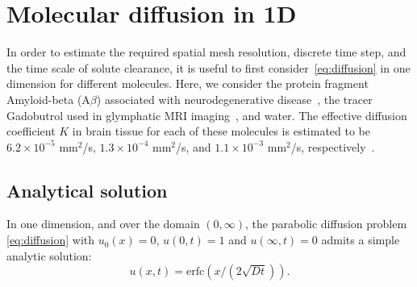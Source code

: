 

\section{Molecular diffusion in 1D}
\label{sec:chp6:1D-tests}

In order to estimate the required spatial mesh resolution, discrete
time step, and the time scale of solute clearance, it is useful to
first consider~\eqref{eq:diffusion} in one dimension for different
molecules. Here, we consider the protein fragment Amyloid-beta
(A$\beta$) associated with neurodegenerative
disease~\cite{iliff2012paravascular}, the tracer Gadobutrol used in
glymphatic MRI imaging~\cite{ringstad2018brain}, and water. The
effective diffusion coefficient $K$ in brain tissue for each of these
molecules is estimated to be $6.2 \times 10^{-5}$ mm$^2$/s,
$1.3 \times 10^{-4}$ mm$^2$/s, and $1.1 \times 10^{-3}$ mm$^2$/s,
respectively~\cite{waters2010concentration,valnes2020apparent}.

\subsection{Analytical solution}

In one dimension, and over the domain $(0, \infty)$, the parabolic
diffusion problem \eqref{eq:diffusion} with $u_0(x)=0$, $u(0, t) = 1$
and $u(\infty, t) = 0$ admits a simple analytic solution:
\begin{equation}
  \label{eq:analytical:1D}
  u(x,t) =  \mbox{erfc}(x / (2 \sqrt{D t})). 
\end{equation}

